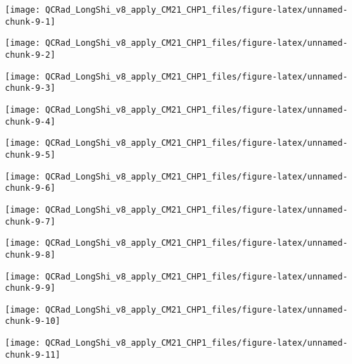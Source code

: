 \documentclass[
  10pt,
  a4paper,oneside]{article}
\begin{document}
\begin{center}\texttt{[image: QCRad\_LongShi\_v8\_apply\_CM21\_CHP1\_files/figure-latex/unnamed-chunk-9-1]} \end{center}

\begin{center}\texttt{[image: QCRad\_LongShi\_v8\_apply\_CM21\_CHP1\_files/figure-latex/unnamed-chunk-9-2]} \end{center}

\begin{center}\texttt{[image: QCRad\_LongShi\_v8\_apply\_CM21\_CHP1\_files/figure-latex/unnamed-chunk-9-3]} \end{center}

\begin{center}\texttt{[image: QCRad\_LongShi\_v8\_apply\_CM21\_CHP1\_files/figure-latex/unnamed-chunk-9-4]} \end{center}

\begin{center}\texttt{[image: QCRad\_LongShi\_v8\_apply\_CM21\_CHP1\_files/figure-latex/unnamed-chunk-9-5]} \end{center}

\begin{center}\texttt{[image: QCRad\_LongShi\_v8\_apply\_CM21\_CHP1\_files/figure-latex/unnamed-chunk-9-6]} \end{center}

\begin{center}\texttt{[image: QCRad\_LongShi\_v8\_apply\_CM21\_CHP1\_files/figure-latex/unnamed-chunk-9-7]} \end{center}

\begin{center}\texttt{[image: QCRad\_LongShi\_v8\_apply\_CM21\_CHP1\_files/figure-latex/unnamed-chunk-9-8]} \end{center}

\begin{center}\texttt{[image: QCRad\_LongShi\_v8\_apply\_CM21\_CHP1\_files/figure-latex/unnamed-chunk-9-9]} \end{center}

\begin{center}\texttt{[image: QCRad\_LongShi\_v8\_apply\_CM21\_CHP1\_files/figure-latex/unnamed-chunk-9-10]} \end{center}

\begin{center}\texttt{[image: QCRad\_LongShi\_v8\_apply\_CM21\_CHP1\_files/figure-latex/unnamed-chunk-9-11]} \end{center}
\end{document}
